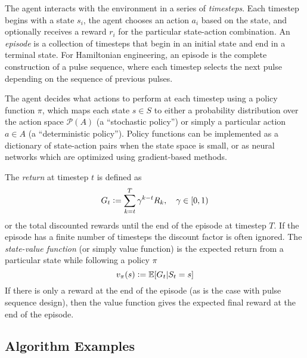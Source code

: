 The agent interacts with the environment in a series of \emph{timesteps}. Each timestep begins with a state $s_i$, the agent chooses an action $a_i$ based on the state, and optionally receives a reward $r_i$ for the particular state-action combination. An \emph{episode} is a collection of timesteps that begin in an initial state and end in a terminal state. For Hamiltonian engineering, an episode is the complete construction of a pulse sequence, where each timestep selects the next pulse depending on the sequence of previous pulses.

The agent decides what actions to perform at each timestep using a policy function $\pi$, which maps each state $s \in S$ to either a probability distribution over the action space $\mathcal{P}(A)$ (a ``stochastic policy'') or simply a particular action $a \in A$ (a ``deterministic policy''). Policy functions can be implemented as a dictionary of state-action pairs when the state space is small, or as neural networks which are optimized using gradient-based methods.

The \emph{return} at timestep $t$ is defined as
\begin{equation}\label{eq:return}
    G_t \mathrel{\mathop:}= \sum_{k=t}^T \gamma^{k-t} R_k, \quad \gamma \in [0,1)
\end{equation}
or the total discounted rewards until the end of the episode at timestep $T$. If the episode has a finite number of timesteps the discount factor is often ignored. The \emph{state-value function} (or simply value function) is the expected return from a particular state while following a policy $\pi$
\begin{equation}\label{eq:state_value}
    v_\pi(s) \mathrel{\mathop:}= \mathbb E[G_t | S_t = s]
\end{equation}
If there is only a reward at the end of the episode (as is the case with pulse sequence design), then the value function gives the expected final reward at the end of the episode.



\subsection{Algorithm Examples}

